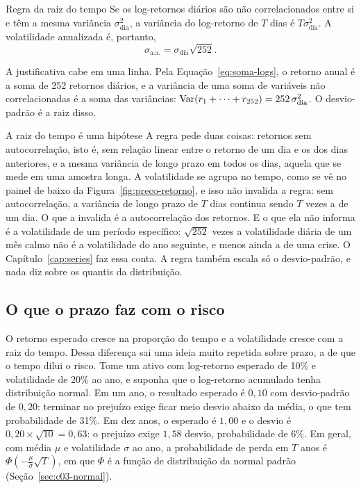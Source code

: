 \begin{resultado}{Regra da raiz do tempo}
Se os log-retornos diários são não correlacionados entre si e têm a mesma variância $\sigma_{\text{dia}}^2$, a variância do log-retorno de $T$ dias é $T\sigma_{\text{dia}}^2$. A volatilidade anualizada é, portanto,
\begin{equation}
  \sigma_{\text{a.a.}} = \sigma_{\text{dia}} \sqrt{252} .
  \label{eq:raiz-tempo}
\end{equation}
\end{resultado}

A justificativa cabe em uma linha. Pela Equação~\eqref{eq:soma-logs}, o retorno anual é a soma de 252 retornos diários, e a variância de uma soma de variáveis não correlacionadas é a soma das variâncias: $\operatorname{Var}(r_1 + \dots + r_{252}) = 252\,\sigma_{\text{dia}}^2$. O desvio-padrão é a raiz disso.

\begin{armadilha}{A raiz do tempo é uma hipótese}
A regra pede duas coisas: retornos sem autocorrelação, isto é, sem relação linear entre o retorno de um dia e os dos dias anteriores, e a mesma variância de longo prazo em todos os dias, aquela que se mede em uma amostra longa. A volatilidade se agrupa no tempo, como se vê no painel de baixo da Figura~\ref{fig:preco-retorno}, e isso não invalida a regra: sem autocorrelação, a variância de longo prazo de $T$ dias continua sendo $T$ vezes a de um dia. O que a invalida é a autocorrelação dos retornos. E o que ela não informa é a volatilidade de um período específico: $\sqrt{252}$ vezes a volatilidade diária de um mês calmo não é a volatilidade do ano seguinte, e menos ainda a de uma crise. O Capítulo~\ref{cap:series} faz essa conta. A regra também escala só o desvio-padrão, e nada diz sobre os quantis da distribuição.
\end{armadilha}

\subsection{O que o prazo faz com o risco}

O retorno esperado cresce na proporção do tempo e a volatilidade cresce com a raiz do tempo. Dessa diferença sai uma ideia muito repetida sobre prazo, a de que o tempo dilui o risco. Tome um ativo com log-retorno esperado de 10\% e volatilidade de 20\% ao ano, e suponha que o log-retorno acumulado tenha distribuição normal. Em um ano, o resultado esperado é $0,10$ com desvio-padrão de $0,20$: terminar no prejuízo exige ficar meio desvio abaixo da média, o que tem probabilidade de 31\%. Em dez anos, o esperado é $1,00$ e o desvio é $0,20 \times \sqrt{10} = 0,63$: o prejuízo exige $1,58$ desvio, probabilidade de 6\%. Em geral, com média $\mu$ e volatilidade $\sigma$ ao ano, a probabilidade de perda em $T$ anos é $\Phi(-\tfrac{\mu}{\sigma}\sqrt{T})$, em que $\Phi$ é a função de distribuição da normal padrão (Seção~\ref{sec:c03-normal}).

